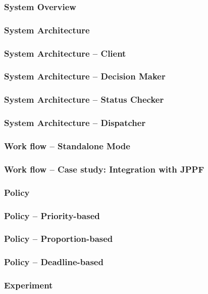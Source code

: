 \documentclass{beamer}
\begin{document}
\begin{frame}
  \frametitle{System Overview}
\end{frame}
\begin{frame}
  \frametitle{System Architecture}
\end{frame}
\begin{frame}
  \frametitle{System Architecture -- Client}
\end{frame}
\begin{frame}
  \frametitle{System Architecture -- Decision Maker}
\end{frame}
\begin{frame}
  \frametitle{System Architecture -- Status Checker}
\end{frame}
\begin{frame}
  \frametitle{System Architecture -- Dispatcher}
\end{frame}
\begin{frame}
  \frametitle{Work flow -- Standalone Mode}
\end{frame}
\begin{frame}
  \frametitle{Work flow -- Case study: Integration with JPPF}
\end{frame}
\begin{frame}
  \frametitle{Policy}
\end{frame}
\begin{frame}
  \frametitle{Policy -- Priority-based}
\end{frame}
\begin{frame}
  \frametitle{Policy -- Proportion-based}
\end{frame}
\begin{frame}
  \frametitle{Policy -- Deadline-based}
\end{frame}
\begin{frame}
  \frametitle{Experiment}
\end{frame}
\end{document}
